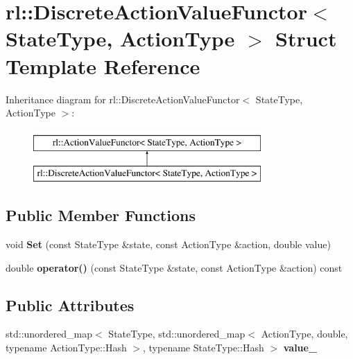 \hypertarget{structrl_1_1_discrete_action_value_functor}{}\section{rl\+:\+:Discrete\+Action\+Value\+Functor$<$ State\+Type, Action\+Type $>$ Struct Template Reference}
\label{structrl_1_1_discrete_action_value_functor}
Inheritance diagram for rl\+:\+:Discrete\+Action\+Value\+Functor$<$ State\+Type, Action\+Type $>$\+:\begin{figure}[H]
\begin{center}
\leavevmode
\includegraphics[height=2.000000cm]{structrl_1_1_discrete_action_value_functor}
\end{center}
\end{figure}
\subsection*{Public Member Functions}
\begin{DoxyCompactItemize}
\item 
\hypertarget{structrl_1_1_discrete_action_value_functor_a05b2e109cfcde8169b5cec710412cb54}{}\label{structrl_1_1_discrete_action_value_functor_a05b2e109cfcde8169b5cec710412cb54} 
void {\bfseries Set} (const State\+Type \&state, const Action\+Type \&action, double value)
\item 
\hypertarget{structrl_1_1_discrete_action_value_functor_a74c6f0ed5af23c049dafac2b7b02f8f6}{}\label{structrl_1_1_discrete_action_value_functor_a74c6f0ed5af23c049dafac2b7b02f8f6} 
double {\bfseries operator()} (const State\+Type \&state, const Action\+Type \&action) const
\end{DoxyCompactItemize}
\subsection*{Public Attributes}
\begin{DoxyCompactItemize}
\item 
\hypertarget{structrl_1_1_discrete_action_value_functor_aeb9044d42d523c3e068254555c84aa22}{}\label{structrl_1_1_discrete_action_value_functor_aeb9044d42d523c3e068254555c84aa22} 
std\+::unordered\+\_\+map$<$ State\+Type, std\+::unordered\+\_\+map$<$ Action\+Type, double, typename Action\+Type\+::\+Hash $>$, typename State\+Type\+::\+Hash $>$ {\bfseries value\+\_\+}
\end{DoxyCompactItemize}


